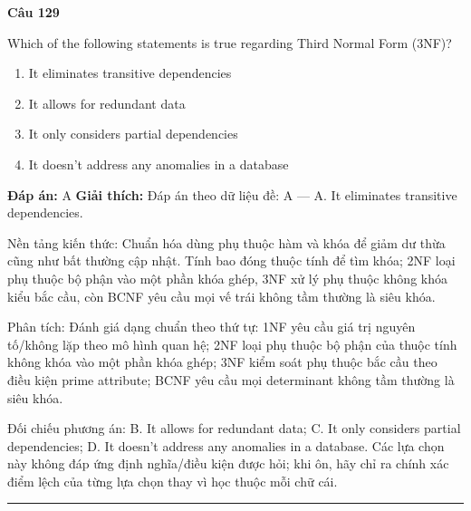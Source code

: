 \documentclass[11pt,a4paper]{article}
\newenvironment{question}[1]{%
  \par\vspace{1em}\noindent\textbf{\large Câu #1}\par\vspace{0.4em}
}{%
  \par\vspace{1em}\hrule\vspace{0.6em}
}
\newenvironment{choices}{%
  \begin{enumerate}[label=\textbf{\Alph*.},leftmargin=2.2em,itemsep=2pt,topsep=3pt]
}{%
  \end{enumerate}
}
\newcommand{\choice}{\item}
\begin{document}
\begin{question}{129}
Which of the following statements is true regarding Third Normal Form (3NF)?
\begin{choices}
\choice It eliminates transitive dependencies
\choice It allows for redundant data
\choice It only considers partial dependencies
\choice It doesn't address any anomalies in a database
\end{choices}
\textbf{Đáp án:} A
\textbf{Giải thích:} Đáp án theo dữ liệu đề: A — A. It eliminates transitive dependencies.

Nền tảng kiến thức: Chuẩn hóa dùng phụ thuộc hàm và khóa để giảm dư thừa cũng như bất thường cập nhật. Tính bao đóng thuộc tính để tìm khóa; 2NF loại phụ thuộc bộ phận vào một phần khóa ghép, 3NF xử lý phụ thuộc không khóa kiểu bắc cầu, còn BCNF yêu cầu mọi vế trái không tầm thường là siêu khóa.

Phân tích: Đánh giá dạng chuẩn theo thứ tự: 1NF yêu cầu giá trị nguyên tố/không lặp theo mô hình quan hệ; 2NF loại phụ thuộc bộ phận của thuộc tính không khóa vào một phần khóa ghép; 3NF kiểm soát phụ thuộc bắc cầu theo điều kiện prime attribute; BCNF yêu cầu mọi determinant không tầm thường là siêu khóa.

Đối chiếu phương án: B. It allows for redundant data; C. It only considers partial dependencies; D. It doesn't address any anomalies in a database. Các lựa chọn này không đáp ứng định nghĩa/điều kiện được hỏi; khi ôn, hãy chỉ ra chính xác điểm lệch của từng lựa chọn thay vì học thuộc mỗi chữ cái.
\end{question}
\end{document}

